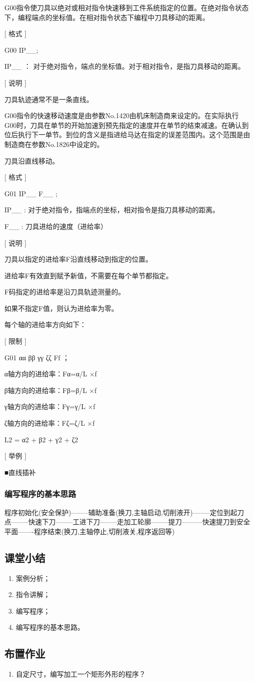 G00指令使刀具以绝对或相对指令快速移到工件系统指定的位置。在绝对指令状态下，编程端点的坐标值。在相对指令状态下编程中刀具移动的距离。

[ 格式 ]

G00 IP\_\_;

IP\_\_ ：
对于绝对指令，端点的坐标值。对于相对指令，是指刀具移动的距离。

[ 说明 ]

刀具轨迹通常不是一条直线。

G00指令的快速移动速度是由参数No.1420由机床制造商来设定的。在实际执行G00时，刀具在单节的开始加速到预先指定的速度并在单节的结束减速。在确认到位后执行下一单节。到位的含义是指进给马达在指定的误差范围内。这个范围是由制造商在参数No.1826中设定的。

刀具沿直线移动。

[ 格式 ]

G01 IP\_\_ F\_\_ ;

IP\_\_ : 对于绝对指令，指端点的坐标，相对指令是指刀具移动的距离。

F\_\_ : 刀具进给的速度（进给率）

[ 说明 ]

刀具以指定的进给率F沿直线移动到指定的位置。

进给率F有效直到赋予新值，不需要在每个单节都指定。

F码指定的进给率是沿刀具轨迹测量的。

如果不指定F值，则认为进给率为零。

每个轴的进给率方向如下：

[ 限制 ]

G01 αα ββ γγ ζζ Ff  ；

α轴方向的进给率：Fα=α/L ×f

β轴方向的进给率：Fβ=β/L ×f

γ轴方向的进给率：Fγ=γ/L ×f

ζ轴方向的进给率：Fζ=ζ/L ×f

L2 = α2 + β2 + γ2 + ζ2

[ 举例 ]

■直线插补


\subsubsection{编写程序的基本思路}
程序初始化(安全保护)--------辅助准备(换刀,主轴启动,切削液开)--------定位到起刀点--------快速下刀--------工进下刀--------走加工轮廓--------提刀---------快速提刀到安全平面-------程序结束(换刀,主轴停止,切削液关,程序返回等)
\subsection{课堂小结}
\begin{enumerate}[1、]
\item 案例分析；
\item 指令讲解；
\item 编写程序；
\item 编写程序的基本思路。
\end{enumerate}
\vfill
\subsection{布置作业}
\begin{enumerate}[1、]
	\item 自定尺寸，编写加工一个矩形外形的程序？
\end{enumerate}
\vfill